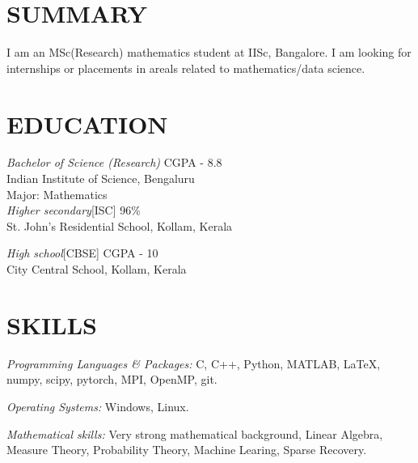 \documentclass[margin, 10pt]{res} %
\begin{document}
\begin{resume}

 
\section{SUMMARY}  

	I am an MSc(Research) mathematics student at IISc, Bangalore.
	I am looking for internships or placements in areals related to
	mathematics/data science.


\section{EDUCATION}
{\sl Bachelor of Science (Research)} \hfill CGPA - 8.8\\
Indian Institute of Science, Bengaluru\\
Major: Mathematics\\

{\sl Higher secondary}[ISC]  \hfill  96\%\\
St. John's Residential School, Kollam, Kerala

{\sl High school}[CBSE] \hfill CGPA - 10\\
City Central School, Kollam, Kerala 


\section{SKILLS} 

{\sl Programming Languages \& Packages:} 
 C, C++, Python, MATLAB, \LaTeX,
	numpy, scipy, pytorch, MPI, OpenMP, git.

{\sl Operating Systems:} Windows, Linux.

{\sl Mathematical skills:} Very strong mathematical background,
	Linear Algebra, Measure Theory, Probability Theory,
	Machine Learing, Sparse Recovery.


\end{resume}
\end{document}
